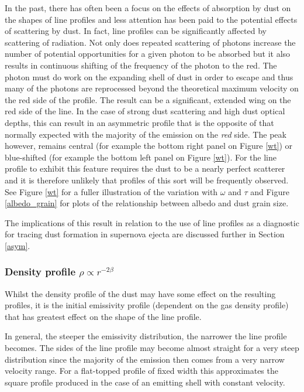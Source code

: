 \documentclass[useAMS,usenatbib,usegraphicx]{mnras}
\begin{document}
In the past, there has often been a focus on the effects of absorption by dust 
on the shapes of line profiles and less attention has been paid to the 
potential effects of scattering by dust.  In fact, line profiles 
can be significantly affected by scattering of radiation.  Not only does 
repeated scattering of photons increase the number of potential 
opportunities for a given photon to be absorbed but it also results in 
continuous shifting of the frequency of the photon to the red.  The photon 
must do work on the expanding shell of dust in order to escape and thus 
many of the photons are reprocessed beyond the theoretical maximum 
velocity on the red side of the profile.  The result can be a significant, 
extended wing on the red side of the line.  In the case of strong 
dust scattering and high dust optical depths, this can result in an asymmetric profile that is the opposite 
of that normally expected with the majority of the emission on the 
\textit{red} side.  The peak however, remains central (for example the bottom right panel on Figure \ref{wt}) or blue-shifted (for example the bottom left panel on Figure \ref{wt}).  
For the line profile to exhibit this feature requires the dust to be a 
nearly perfect scatterer and it is therefore unlikely that profiles of this sort will be
frequently observed.  See Figure \ref{wt} for a fuller illustration of the variation
with $\omega$ and $\tau$ and Figure \ref{albedo_grain} for plots of the relationship between albedo and dust grain size.

The implications of this result in relation to the use of line profiles as 
a diagnostic for tracing dust formation in supernova ejecta 
are discussed further in Section \ref{asym}.


\subsubsection{Density profile $\rho \propto r^{-2\beta}$}
\label{beta}

Whilst the density profile of the dust may have some effect on the 
resulting profiles, it is the initial emissivity profile (dependent on the 
gas density profile) that has greatest effect on the shape of 
the line profile.

In general, the steeper the emissivity distribution, the narrower the line 
profile becomes.  The sides of the line profile may become almost straight 
for a very steep distribution since the majority of the emission then 
comes from a very narrow velocity range.  For a flat-topped profile of 
fixed width this approximates the square profile produced in the case of 
an emitting shell with constant velocity.
\end{document}
